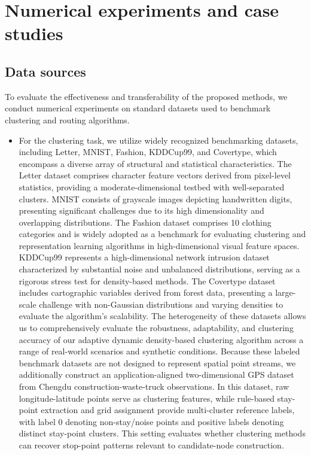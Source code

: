 \documentclass[preprint,12pt,authoryear]{elsarticle}
\theoremstyle{definition}
\begin{document}
\section{Numerical experiments and case studies}\label{sec5}

\subsection{Data sources}

To evaluate the effectiveness and transferability of the proposed methods, we conduct numerical experiments on standard datasets used to benchmark clustering and routing algorithms.  
\begin{itemize}
\item For the clustering task, we utilize widely recognized benchmarking datasets, including  Letter, MNIST, Fashion, KDDCup99, and Covertype, which encompass a diverse array of structural and statistical characteristics. The Letter dataset comprises character feature vectors derived from pixel-level statistics, providing a moderate-dimensional testbed with well-separated clusters. MNIST consists of grayscale images depicting handwritten digits, presenting significant challenges due to its high dimensionality and overlapping distributions. The Fashion dataset comprises 10 clothing categories and is widely adopted as a benchmark for evaluating clustering and representation learning algorithms in high-dimensional visual feature spaces. KDDCup99 represents a high-dimensional network intrusion dataset characterized by substantial noise and unbalanced distributions, serving as a rigorous stress test for density-based methods. The Covertype dataset includes cartographic variables derived from forest data, presenting a large-scale challenge with non-Gaussian distributions and varying densities to evaluate the algorithm's scalability. The heterogeneity of these datasets allows us to comprehensively evaluate the robustness, adaptability, and clustering accuracy of our adaptive dynamic density-based clustering algorithm across a range of real-world scenarios and synthetic conditions. Because these labeled benchmark datasets are not designed to represent spatial point streams, we additionally construct an application-aligned two-dimensional GPS dataset from Chengdu construction-waste-truck observations. In this dataset, raw longitude-latitude points serve as clustering features, while rule-based stay-point extraction and grid assignment provide multi-cluster reference labels, with label 0 denoting non-stay/noise points and positive labels denoting distinct stay-point clusters. This setting evaluates whether clustering methods can recover stop-point patterns relevant to candidate-node construction.


\end{itemize}
\end{document}
